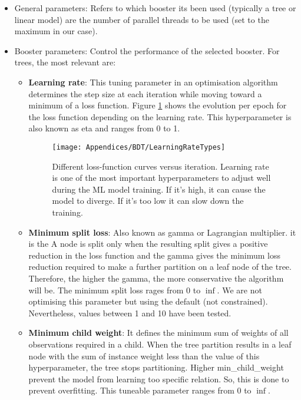 \begin{itemize}
	\item General parameters: Refers to which booster its been used (typically a tree or linear model) are the number of
	parallel threads to be used (set to the maximum in our case). 
	\item Booster parameters: Control the performance of the selected booster. 
	For trees, the most relevant are: 
	\begin{itemize} %
		\item \textbf{Learning rate}: 
		This tuning parameter in an optimisation algorithm 
		determines the step size at each iteration while moving toward a minimum of a loss function.
		Figure \ref{fig:Appendix:BDT:LearingRateTypes} shows the evolution per epoch for the loss function
		depending on the learning rate. This hyperparameter is also known as eta and ranges from 0 to 1.
			\begin{figure}
			\centering
  			\centering
  			\texttt{[image: Appendices/BDT/LearningRateTypes]}
			\caption{Different loss-function curves versus iteration.
			Learning rate is one of the most important hyperparameters to adjust well during the ML model training. 
			If it's high, it can cause the model to diverge. If it's too low it can slow down the training.}
			\label{fig:Appendix:BDT:LearingRateTypes}
		\end{figure}
		
		\item \textbf{Minimum split loss}: 
		Also known as gamma or Lagrangian multiplier. it is the 
		A node is split only when the resulting split gives a positive reduction in the loss function
		and the gamma gives the minimum loss reduction required to make a further partition
		 on a leaf node of the tree. Therefore, the higher the gamma, the more conservative the algorithm
		 will be. The minimum split loss rages from 0 to $\inf$. 
		 We are not optimising this parameter but using the default (not constrained). 
		 Nevertheless, values between 1 and 10 have been tested.
		
		\item \textbf{Minimum child weight}: 
		It defines the minimum sum of weights of all observations required in a child.
		When the tree partition results in a leaf node with the sum of instance weight less than the value of 
		this hyperparameter, the tree stops partitioning. Higher min\_child\_weight prevent the model from learning
		too specific relation. So, this is done to prevent overfitting. This tuneable parameter ranges from 0 to $\inf$.
		

\end{itemize}
\end{itemize}
